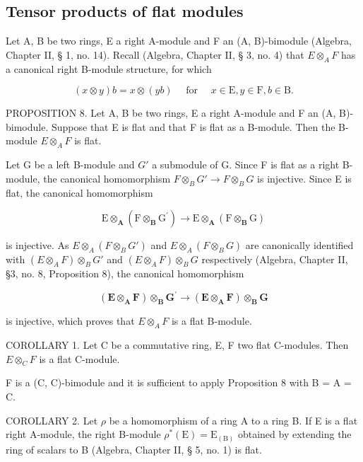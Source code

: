 \subsection{Tensor products of flat modules}

Let A, B be two rings, E a right A-module and F an (A, B)-bimodule (Algebra, Chapter II, § 1, no. 14). Recall (Algebra, Chapter II, § 3, no. 4) that \(E \otimes_{A} F\) has a canonical right B-module structure, for which

\[
(x \otimes y) b = x \otimes (y b) \quad \text {   for   } \quad x \in \mathrm{E}, y \in \mathrm{F}, b \in \mathrm{B}.
\]

PROPOSITION 8. Let A, B be two rings, E a right A-module and F an (A, B)-bimodule. Suppose that E is flat and that F is flat as a B-module. Then the B-module \(E \otimes_{A} F\) is flat.

Let G be a left B-module and \(G'\) a submodule of G. Since F is flat as a right B-module, the canonical homomorphism \(F \otimes_{B} G' \to F \otimes_{B} G\) is injective. Since E is flat, the canonical homomorphism

\[
\mathrm{E} \otimes_ {\mathbf {A}} (\mathrm{F} \otimes_ {\mathbf {B}} \mathrm{G} ^ {\prime}) \rightarrow \mathrm{E} \otimes_ {\mathbf {A}} (\mathrm{F} \otimes_ {\mathbf {B}} \mathrm{G})
\]

is injective. As \(E \otimes_{A} (F \otimes_{B} G')\) and \(E \otimes_{A} (F \otimes_{B} G)\) are canonically identified with \((E \otimes_{A} F) \otimes_{B} G'\) and \((E \otimes_{A} F) \otimes_{B} G\) respectively (Algebra, Chapter II, §3, no. 8, Proposition 8), the canonical homomorphism

\[
(\mathbf {E} \otimes_ {\mathbf {A}} \mathbf {F}) \otimes_ {\mathbf {B}} \mathbf {G} ^ {\prime} \rightarrow (\mathbf {E} \otimes_ {\mathbf {A}} \mathbf {F}) \otimes_ {\mathbf {B}} \mathbf {G}
\]

is injective, which proves that \(E \otimes_{A} F\) is a flat B-module.

COROLLARY 1. Let C be a commutative ring, E, F two flat C-modules. Then \(E \otimes_{C} F\) is a flat C-module.

F is a (C, C)-bimodule and it is sufficient to apply Proposition 8 with B = A = C.

COROLLARY 2. Let \(\rho\) be a homomorphism of a ring A to a ring B. If E is a flat right A-module, the right B-module \(\rho^{*}(\mathrm{E}) = \mathrm{E}_{(\mathrm{B})}\) obtained by extending the ring of scalars to B (Algebra, Chapter II, § 5, no. 1) is flat.

